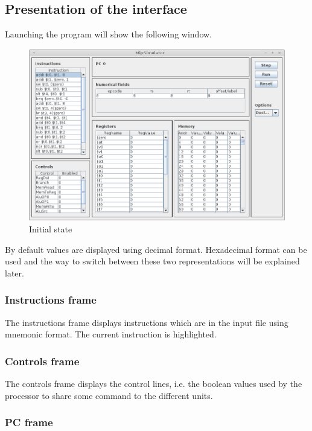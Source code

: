 \subsection{Presentation of the interface}

	Launching the program will show the following window. 
	\begin{figure}[H]
		\centering
		\includegraphics[scale=0.6]{img/main_window_s0.png}
		\caption{Initial state}
		\label{fig:ini_state}		
	\end{figure}
	
	By default values are displayed using decimal format. Hexadecimal format can be used and the way to switch between these two representations will be explained later.
	
	\subsubsection{Instructions frame}
	
		The instructions frame displays instructions which are in the input file using mnemonic format. The current instruction is highlighted. 

	\subsubsection{Controls frame}
	
		The controls frame displays the control lines, i.e. the boolean values used by the processor to share some command to the different units.
		
	\subsubsection{PC frame}
	

